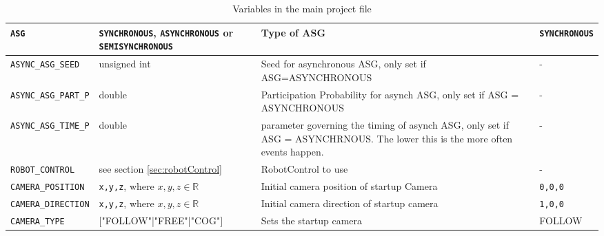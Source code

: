 \begin{sidewaystable}
\begin{tabular}{|l|p{}|p{}|p{}|}
		\texttt{ASG} & \texttt{SYNCHRONOUS}, \texttt{ASYNCHRONOUS} or \texttt{SEMISYNCHRONOUS} & Type of ASG & \texttt{SYNCHRONOUS}\\\hline
		  \texttt{ASYNC\_ASG\_SEED} & unsigned int & Seed for asynchronous ASG, only set if ASG=ASYNCHRONOUS & - \\\hline
		    \texttt{ASYNC\_ASG\_PART\_P} & double & Participation Probability for asynch ASG, only set if ASG = ASYNCHRONOUS & - \\\hline
		 \texttt{ASYNC\_ASG\_TIME\_P} & double & parameter governing the timing of asynch ASG, only set if ASG = ASYNCHRNOUS. The lower this is the more often events happen. & - \\\hline
		 
		\texttt{ROBOT\_CONTROL} &  see section \ref{sec:robotControl} & RobotControl to use & -\\\hline
		\texttt{CAMERA\_POSITION} &  \texttt{x,y,z}, where $x,y,z\in\mathbb{R}$& Initial camera position of startup Camera & \texttt{0,0,0}\\\hline
		\texttt{CAMERA\_DIRECTION} &  \texttt{x,y,z}, where $x,y,z\in\mathbb{R}$& Initial camera direction of startup camera & \texttt{1,0,0}\\\hline
		\texttt{CAMERA\_TYPE} &  $[$"FOLLOW"|"FREE"|"COG"$]$& Sets the startup camera& FOLLOW\\\hline
	\end{tabular}
	\caption{Variables in the main project file}\label{tab:mainvars}
\end{sidewaystable}
\thispagestyle{empty}
\clearpage

